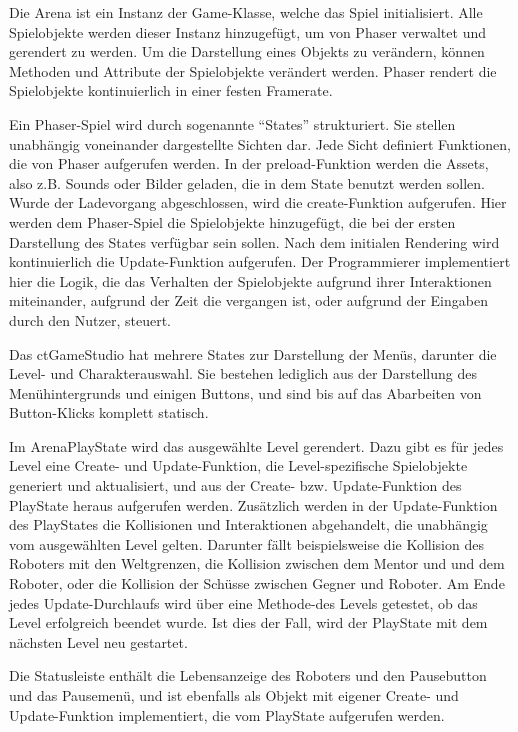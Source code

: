 Die Arena ist ein Instanz der Game-Klasse, welche das Spiel initialisiert. Alle Spielobjekte werden
dieser Instanz hinzugefügt, um von Phaser verwaltet und gerendert zu werden. Um die Darstellung
eines Objekts zu verändern, können Methoden und Attribute der Spielobjekte verändert werden. Phaser
rendert die Spielobjekte kontinuierlich in einer festen Framerate.

Ein Phaser-Spiel wird durch sogenannte \enquote{States} strukturiert. Sie stellen unabhängig
voneinander dargestellte Sichten dar. Jede Sicht definiert Funktionen, die von Phaser aufgerufen
werden. In der preload-Funktion werden die Assets, also z.B. Sounds oder Bilder geladen, die in dem
State benutzt werden sollen. Wurde der Ladevorgang abgeschlossen, wird die create-Funktion
aufgerufen. Hier werden dem Phaser-Spiel die Spielobjekte hinzugefügt, die bei der ersten
Darstellung des States verfügbar sein sollen. Nach dem initialen Rendering wird kontinuierlich die
Update-Funktion aufgerufen. Der Programmierer implementiert hier die Logik, die das Verhalten der
Spielobjekte aufgrund ihrer Interaktionen miteinander, aufgrund der Zeit die vergangen ist, oder
aufgrund der Eingaben durch den Nutzer, steuert.

Das ctGameStudio hat mehrere States zur Darstellung der Menüs, darunter die Level- und
Charakterauswahl. Sie bestehen lediglich aus der Darstellung des Menühintergrunds und einigen
Buttons, und sind bis auf das Abarbeiten von Button-Klicks komplett statisch.

Im ArenaPlayState wird das ausgewählte Level gerendert. Dazu gibt es für jedes Level eine Create-
und Update-Funktion, die Level-spezifische Spielobjekte generiert und aktualisiert, und aus der
Create- bzw. Update-Funktion des PlayState heraus aufgerufen werden. Zusätzlich werden in der
Update-Funktion des PlayStates die Kollisionen und Interaktionen abgehandelt, die unabhängig vom
ausgewählten Level gelten. Darunter fällt beispielsweise die Kollision des Roboters mit den
Weltgrenzen, die Kollision zwischen dem Mentor und und dem Roboter, oder die Kollision der Schüsse
zwischen Gegner und Roboter. Am Ende jedes Update-Durchlaufs wird über eine Methode-des Levels
getestet, ob das Level erfolgreich beendet wurde. Ist dies der Fall, wird der PlayState mit dem
nächsten Level neu gestartet.

Die Statusleiste enthält die Lebensanzeige des Roboters und den Pausebutton und das Pausemenü, und
ist ebenfalls als Objekt mit eigener Create- und Update-Funktion implementiert, die vom PlayState
aufgerufen werden.

